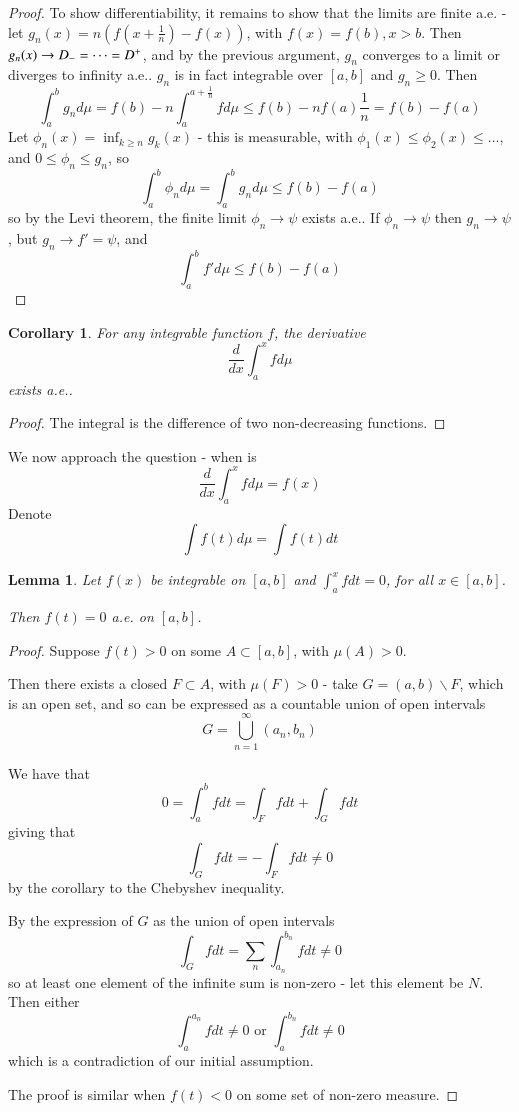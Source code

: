 \documentclass[11pt,a4paper]{report}
\newtheorem{lemma}[theorem]{Lemma}
\newtheorem{corollary}[theorem]{Corollary}
\theoremstyle{plain}
\theoremstyle{definition}
\theoremstyle{remark}
\newcommand{\Union}{\bigcup}
\newcommand{\contradiction}{\begin{flushright} \textreferencemark \end{flushright}}
\begin{document}
\begin{proof}
    To show differentiability, it remains to show that the limits are finite a.e. - let $g_n(x) = n(f(x + \frac{1}{n}) - f(x))$, with $f(x) = f(b), x > b$. Then $g_n(x) \rightarrow D_{-} = \dots = D^{+}$, and by the previous argument, $g_n$ converges to a limit or diverges to infinity a.e.. $g_n$ is in fact integrable over $[a, b]$ and $g_n \ge 0$. Then
    $$ \int_a^b g_n d\mu = f(b) - n\int_a^{a+\frac{1}{n}} f d\mu \le f(b) - nf(a)\frac{1}{n} = f(b) - f(a) $$
    Let $\phi_n(x) = \inf_{k \ge n} g_k(x)$ - this is measurable, with $\phi_1(x) \le \phi_2(x) \le \dots$, and $0 \le \phi_n \le g_n$, so
    $$ \int_a^b \phi_n d\mu = \int_a^b g_n d\mu \le f(b) - f(a) $$
    so by the Levi theorem, the finite limit $\phi_n \rightarrow \psi$ exists a.e.. If $\phi_n \rightarrow \psi$ then $g_n \rightarrow \psi$, but $g_n \rightarrow f' = \psi$, and
    $$ \int_a^b f' d\mu \le f(b) - f(a) $$
\end{proof}

\begin{corollary}\label{derivative_of_integral_exists_ae}
  For any integrable function $f$, the derivative 
  $$ \frac{d}{dx} \int_a^x f d\mu $$
    exists a.e..
\end{corollary}

\begin{proof}
  The integral is the difference of two non-decreasing functions.
\end{proof}

We now approach the question - when is
$$ \frac{d}{dx}\int_a^x fd\mu = f(x) $$
Denote 
$$ \int f(t) d\mu = \int f(t) dt $$

\begin{lemma}
  Let $f(x)$ be integrable on $[a, b]$ and $\int_a^x f dt = 0$, for all $x \in [a, b]$.

    Then $f(t) = 0$ a.e. on $[a, b]$.
\end{lemma}

\begin{proof}
    Suppose $f(t) > 0$ on some $A \subset [a, b]$, with $\mu(A) > 0$.

    Then there exists a closed $F \subset A$, with $\mu(F) > 0$ - take $G = (a, b) \backslash F$, which is an open set, and so can be expressed as a countable union of open intervals
    $$ G = \Union_{n=1}^\infty (a_n, b_n) $$

    We have that
    $$ 0 = \int_a^b f dt = \int_F f dt + \int_G f dt $$
    giving that
    $$ \int_G f dt = -\int_F f dt \ne 0 $$
    by the corollary to the Chebyshev inequality.

    By the expression of $G$ as the union of open intervals
    $$ \int_G f dt = \sum_n \int_{a_n}^{b_n} f dt \ne 0 $$
    so at least one element of the infinite sum is non-zero - let this element be $N$. Then either
    $$ \int_a^{a_n} f dt \ne 0 \text{ or } \int_a^{b_n} f dt \ne 0 $$
    which is a contradiction of our initial assumption. \contradiction

    The proof is similar when $f(t) < 0$ on some set of non-zero measure.
\end{proof}
\end{document}
